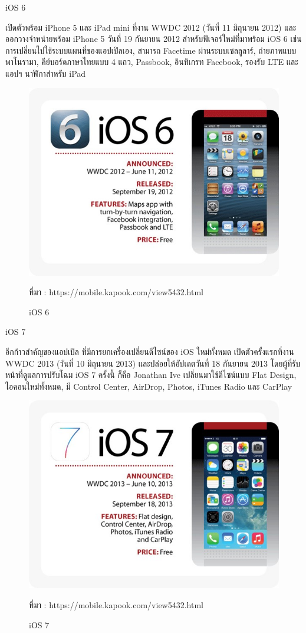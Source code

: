 	iOS 6 

	เปิดตัวพร้อม iPhone 5 และ iPad mini ที่งาน WWDC 2012 (วันที่ 11 มิถุนายน 2012) และออกวางจำหน่ายพร้อม iPhone 5 วันที่ 19 กันยายน 2012 สำหรับฟีเจอร์ใหม่ที่มาพร้อม iOS 6 เช่น การเปลี่ยนไปใช้ระบบแผนที่ของแอปเปิลเอง, สามารถ Facetime ผ่านระบบเซลลูลาร์, ถ่ายภาพแบบพาโนรามา, คีย์บอร์ดภาษาไทยแบบ 4 แถว, Passbook, อินทิเกรท Facebook, รองรับ LTE และแอปฯ นาฬิกาสำหรับ iPad

	\begin{figure}[H]
		\centering
		\includegraphics[width=0.8\columnwidth]{Figures/2/iOS/iOS6}
		\caption{iOS 6}{ที่มา : https://mobile.kapook.com/view5432.html}
		\label{Fig:iosversion6}
	\end{figure}

	iOS 7 

	อีกก้าวสำคัญของแอปเปิล ที่มีการยกเครื่องเปลี่ยนดีไซน์ของ iOS ใหม่ทั้งหมด เปิดตัวครั้งแรกที่งาน WWDC 2013 (วันที่ 10 มิถุนายน 2013) และปล่อยให้อัปเดตวันที่ 18 กันยายน 2013 โดยผู้ที่รับหน้าที่ดูแลการปรับโฉม iOS 7 ครั้งนี้ ก็คือ Jonathan Ive เปลี่ยนมาใช้ดีไซน์แบบ Flat Design, ไอคอนใหม่ทั้งหมด, มี Control Center, AirDrop, Photos, iTunes Radio และ CarPlay

	\begin{figure}[H]
		\centering
		\includegraphics[width=0.8\columnwidth]{Figures/2/iOS/iOS7}
		\caption{iOS 7}{ที่มา : https://mobile.kapook.com/view5432.html}
		\label{Fig:iosversion7}
	\end{figure}

